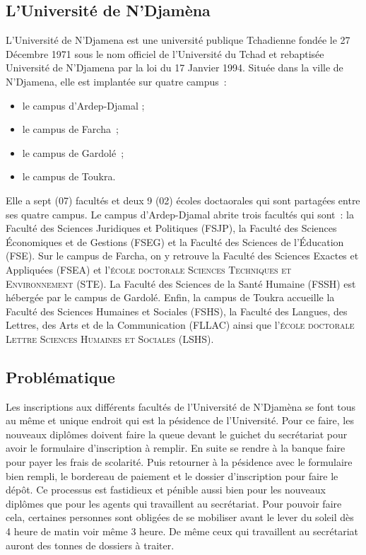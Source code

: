 \documentclass[12pt,a4paper]{article}
\begin{document}
	\subsection{L'Université de N'Djamèna}
	L’Université de N’Djamena est une université publique Tchadienne fondée le 27 Décembre 1971 sous le nom officiel de l’Université du Tchad et rebaptisée Université de N’Djamena par la loi du 17 Janvier 1994. Située dans la ville de N’Djamena, elle est implantée sur quatre campus :
	\begin{itemize}
		\item le campus d’Ardep-Djamal ;
		\item le campus de Farcha ;
		\item le campus de Gardolé ;
		\item le campus de Toukra.
	\end{itemize}
	Elle a sept (07) facultés et deux 9 (02) écoles doctaorales qui sont partagées entre ses quatre campus. Le campus d’Ardep-Djamal abrite trois facultés qui sont : la Faculté des Sciences Juridiques et Politiques (FSJP), la Faculté des Sciences Économiques et de Gestions (FSEG) et la Faculté des Sciences de l’Éducation (FSE). Sur le campus de Farcha, on y retrouve la Faculté des Sciences Exactes et Appliquées (FSEA) et l'\textsc{école doctorale Sciences Techniques et Environnement (STE)}. La Faculté des Sciences de la Santé Humaine (FSSH) est hébergée par le campus de Gardolé. Enfin, la campus de Toukra accueille la Faculté des Sciences Humaines et Sociales (FSHS), la Faculté des Langues, des Lettres, des Arts et de la Communication (FLLAC) ainsi que l'\textsc{école doctorale Lettre Sciences Humaines et Sociales (LSHS)}.
	
	
	\subsection{Problématique}	
	Les inscriptions aux différents facultés de l’Université de N’Djamèna se font tous au même et unique endroit qui est la pésidence de l’Université. Pour ce faire, les nouveaux diplômes doivent faire la queue devant le guichet du secrétariat pour avoir le formulaire d’inscription à remplir. En suite se rendre à la banque faire pour payer les frais de scolarité. Puis retourner à la pésidence avec le formulaire bien rempli, le bordereau de paiement et le dossier d’inscription pour faire le dépôt. Ce processus est fastidieux et pénible aussi bien pour les nouveaux diplômes que pour les agents qui travaillent au secrétariat. Pour pouvoir faire cela, certaines personnes sont obligées de se mobiliser avant le lever du soleil dès 4 heure de matin voir même 3 heure. De même ceux qui travaillent au secrétariat auront des tonnes de dossiers à traiter.
	
\end{document}
